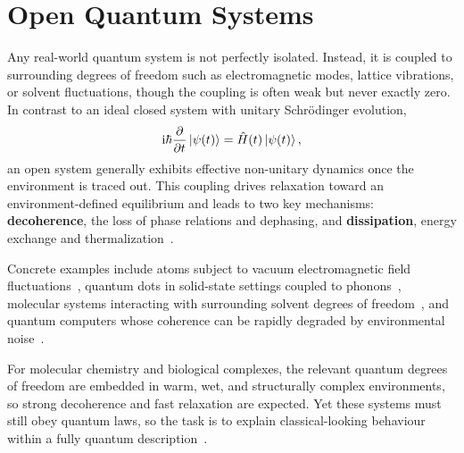 \chapter{Open Quantum Systems} %
\label{chapter:oqs_open_quantum_systems} %


Any real-world quantum system is not perfectly isolated. Instead, it is coupled to surrounding degrees of freedom such as electromagnetic modes, lattice vibrations, or solvent fluctuations, though the coupling is often weak but never exactly zero. In contrast to an ideal closed system with unitary Schrödinger evolution,
\begin{equation}
	\mathrm{i}\hbar \frac{\partial}{\partial t} \ket{\psi(t)} = \hat{H}(t) \ket{\psi(t)},
	\label{eq:oqs_schroedinger_equation}
\end{equation}
an open system generally exhibits effective non-unitary dynamics once the environment is traced out. This coupling drives relaxation toward an environment-defined equilibrium and leads to two key mechanisms: \textbf{decoherence}, the loss of phase relations and dephasing, and \textbf{dissipation}, energy exchange and thermalization~\cite{breuerpetruccione2007theoryopenquantum, weiss2012quantumdissipativesystems}.

Concrete examples include atoms subject to vacuum electromagnetic field fluctuations~\cite{breuerpetruccione2007theoryopenquantum}, quantum dots in solid-state settings coupled to phonons~\cite{kimetal2022analogquantumsimulation}, molecular systems interacting with surrounding solvent degrees of freedom~\cite{mukamel1995principlesnonlinearoptical}, and quantum computers whose coherence can be rapidly degraded by environmental noise~\cite{laddetal2010quantumcomputers}.

For molecular chemistry and biological complexes, the relevant quantum degrees of freedom are embedded in warm, wet, and structurally complex environments, so strong decoherence and fast relaxation are expected. Yet these systems must still obey quantum laws, so the task is to explain classical-looking behaviour within a fully quantum description~\cite{schlosshauer2007decoherencequantumtoclassicaltransition}.


